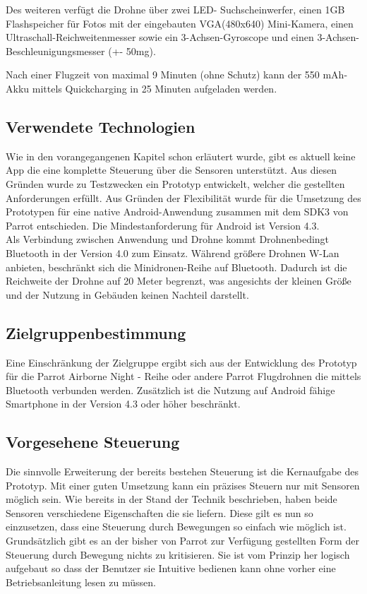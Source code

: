 \documentclass{article}
\begin{document}
Des weiteren verfügt die Drohne über zwei LED- Suchscheinwerfer, einen 1GB Flashspeicher für Fotos mit der eingebauten VGA(480x640) Mini-Kamera, einen Ultraschall-Reichweitenmesser sowie ein 3-Achsen-Gyroscope und einen 3-Achsen- Beschleunigungsmesser (+\/- 50mg).

Nach einer Flugzeit von maximal 9 Minuten (ohne Schutz) kann der 550 mAh-Akku mittels Quickcharging in 25 Minuten aufgeladen werden.

\subsection{Verwendete Technologien}
Wie in den vorangegangenen Kapitel schon erläutert wurde, gibt es aktuell keine App die eine komplette Steuerung über die Sensoren unterstützt. Aus diesen Gründen wurde zu Testzwecken ein Prototyp entwickelt, welcher die gestellten Anforderungen erfüllt. Aus Gründen der Flexibilität wurde für die Umsetzung des Prototypen für eine native Android-Anwendung zusammen mit dem SDK3 von Parrot entschieden. Die Mindestanforderung für Android ist Version 4.3.\\ 

Als Verbindung zwischen Anwendung und Drohne kommt Drohnenbedingt Bluetooth in der Version 4.0 zum Einsatz. Während größere Drohnen W-Lan anbieten, beschränkt sich die Minidronen-Reihe auf Bluetooth. Dadurch ist die Reichweite der Drohne auf 20 Meter begrenzt, was angesichts der kleinen Größe und der Nutzung in Gebäuden keinen Nachteil darstellt.

\subsection{Zielgruppenbestimmung}
Eine Einschränkung der Zielgruppe ergibt sich aus der Entwicklung des Prototyp für die Parrot Airborne Night - Reihe oder andere Parrot Flugdrohnen die mittels Bluetooth verbunden werden. Zusätzlich ist die Nutzung auf Android fähige Smartphone in der Version 4.3 oder höher beschränkt.
  
\subsection{Vorgesehene Steuerung}
Die sinnvolle Erweiterung der bereits bestehen Steuerung ist die Kernaufgabe des Prototyp. Mit einer guten Umsetzung kann ein präzises Steuern nur mit Sensoren möglich sein. Wie bereits in der Stand der Technik beschrieben, haben beide Sensoren verschiedene Eigenschaften die sie liefern. Diese gilt es nun so einzusetzen, dass eine Steuerung durch Bewegungen so einfach wie möglich ist. Grundsätzlich gibt es an der bisher von Parrot zur Verfügung gestellten Form der Steuerung durch Bewegung nichts zu kritisieren. Sie ist vom Prinzip her logisch aufgebaut so dass der Benutzer sie Intuitive bedienen kann ohne vorher eine Betriebsanleitung lesen zu müssen. 
\end{document}
